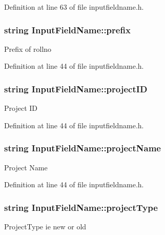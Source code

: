\-Definition at line 63 of file inputfieldname.\-h.

\hypertarget{classInputFieldName_a161d155f8faca2c5dea1bbd607b17553}{
\subsubsection[{prefix}]{\setlength{\rightskip}{0pt plus 5cm}string {\bf \-Input\-Field\-Name\-::prefix}}}\label{classInputFieldName_a161d155f8faca2c5dea1bbd607b17553}
\-Prefix of rollno 

\-Definition at line 44 of file inputfieldname.\-h.

\hypertarget{classInputFieldName_ac4bd117f3137956473f1a1d5ce9106a5}{
\subsubsection[{project\-I\-D}]{\setlength{\rightskip}{0pt plus 5cm}string {\bf \-Input\-Field\-Name\-::project\-I\-D}}}\label{classInputFieldName_ac4bd117f3137956473f1a1d5ce9106a5}
\-Project \-I\-D 

\-Definition at line 44 of file inputfieldname.\-h.

\hypertarget{classInputFieldName_ab93b034743570810afe89aea88a7bbf6}{
\subsubsection[{project\-Name}]{\setlength{\rightskip}{0pt plus 5cm}string {\bf \-Input\-Field\-Name\-::project\-Name}}}\label{classInputFieldName_ab93b034743570810afe89aea88a7bbf6}
\-Project \-Name 

\-Definition at line 44 of file inputfieldname.\-h.

\hypertarget{classInputFieldName_aaa398a603dfe98f4eca022ec9d90bc09}{
\subsubsection[{project\-Type}]{\setlength{\rightskip}{0pt plus 5cm}string {\bf \-Input\-Field\-Name\-::project\-Type}}}\label{classInputFieldName_aaa398a603dfe98f4eca022ec9d90bc09}
\-Project\-Type ie new or old 

